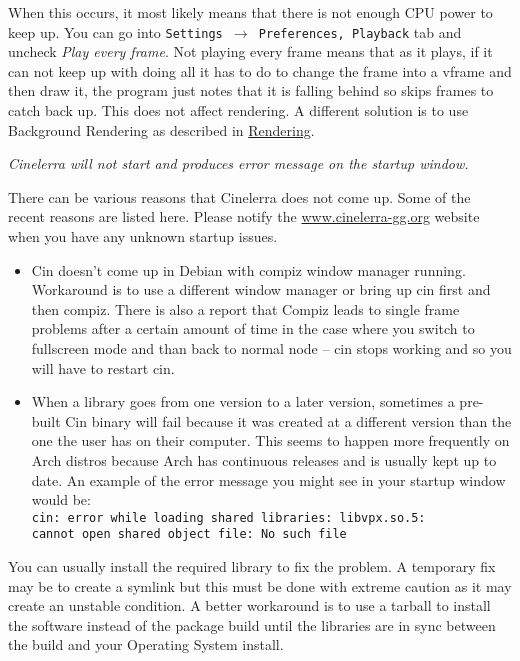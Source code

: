 When this occurs, it most likely means that there is not enough CPU power to keep up. You can go into \texttt{Settings $\rightarrow$ Preferences, Playback} tab and uncheck \textit{Play every frame}. Not playing every frame means that as it plays, if it can not keep up with doing all it has to do to change the frame into a vframe and then draw it, the program just notes that it is falling behind so skips frames to catch back up. This does not affect rendering. A different solution is to use Background Rendering as described in \href{sec:background_rendering}{Rendering}.
\bigskip

\textit{Cinelerra will not start and produces error message on the startup window.}

There can be various reasons that Cinelerra does not come up. Some of the recent reasons are listed here. Please notify the {\small \href{http://www.cinelerra-gg.org/}{www.cinelerra-gg.org}} website when you have any unknown startup issues.
\medskip

\begin{itemize}[nosep]
	\item Cin doesn't come up in Debian with compiz window manager running. Workaround is to use a different window manager or bring up cin first and then compiz. There is also a report that Compiz leads to single frame problems after a certain amount of time in the case where you switch to fullscreen mode and than back to normal node -- cin stops working and so you will have to restart cin.
	\item When a library goes from one version to a later version, sometimes a pre-built Cin binary will fail because it was created at a different version than the one the user has on their computer. This seems to happen more frequently on Arch distros because Arch has continuous releases and is usually kept up to date. An example of the error message you might see in your startup window would be:\\
	\texttt{cin: error while loading shared libraries: libvpx.so.5: \\
	cannot open shared object file: No such file}
\end{itemize}
\medskip

You can usually install the required library to fix the problem. A temporary fix may be to create a symlink but this must be done with extreme caution as it may create an unstable condition. A better workaround is to use a tarball to install the software instead of the package build until the libraries are in sync between the build and your Operating System install.
\bigskip

